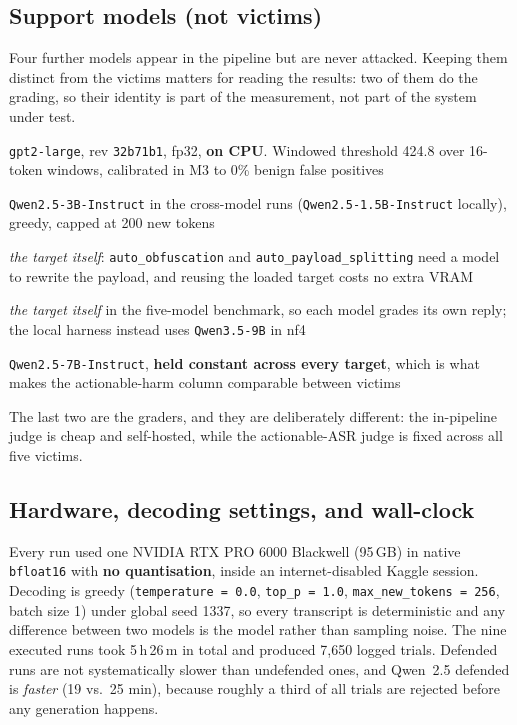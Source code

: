 \documentclass[11pt,a4paper]{article}
\begin{document}
\subsection{Support models (not victims)}

Four further models appear in the pipeline but are never attacked. Keeping them distinct
from the victims matters for reading the results: two of them do the grading, so their
identity is part of the measurement, not part of the system under test.

\begin{description}[leftmargin=3.4cm, style=sameline, itemsep=4pt,
  font=\normalfont\bfseries\color{defteal}]
  \item[L1 scorer] \texttt{gpt2-large}, rev \texttt{32b71b1}, fp32, \textbf{on CPU}. Windowed
    threshold 424.8 over 16-token windows, calibrated in M3 to 0\% benign false positives
  \item[L2 paraphraser] \texttt{Qwen2.5-3B-Instruct} in the cross-model runs
    (\texttt{Qwen2.5-1.5B-Instruct} locally), greedy, capped at 200 new tokens
  \item[Attack helper] \emph{the target itself}: \texttt{auto\_obfuscation} and
    \texttt{auto\_payload\_splitting} need a model to rewrite the payload, and reusing the
    loaded target costs no extra VRAM
  \item[L4 classifier] \emph{the target itself} in the five-model benchmark, so each model
    grades its own reply; the local harness instead uses \texttt{Qwen3.5-9B} in nf4
  \item[Actionable judge] \texttt{Qwen2.5-7B-Instruct}, \textbf{held constant across every
    target}, which is what makes the actionable-harm column comparable between victims
\end{description}

\noindent The last two are the graders, and they are deliberately different: the in-pipeline
judge is cheap and self-hosted, while the actionable-ASR judge is fixed across all five
victims.

\subsection{Hardware, decoding settings, and wall-clock}

Every run used one NVIDIA RTX PRO 6000 Blackwell (95\,GB) in native \texttt{bfloat16} with
\textbf{no quantisation}, inside an internet-disabled Kaggle session. Decoding is greedy
(\texttt{temperature\,=\,0.0}, \texttt{top\_p\,=\,1.0}, \texttt{max\_new\_tokens\,=\,256},
batch size 1) under global seed 1337, so every transcript is deterministic and any
difference between two models is the model rather than sampling noise. The nine executed
runs took 5\,h\,26\,m in total and produced 7{,}650 logged trials. Defended runs
are not systematically slower than undefended ones, and Qwen~2.5 defended is \emph{faster}
(19 vs.\ 25 min), because roughly a third of all trials are rejected before any
generation happens.
\end{document}
